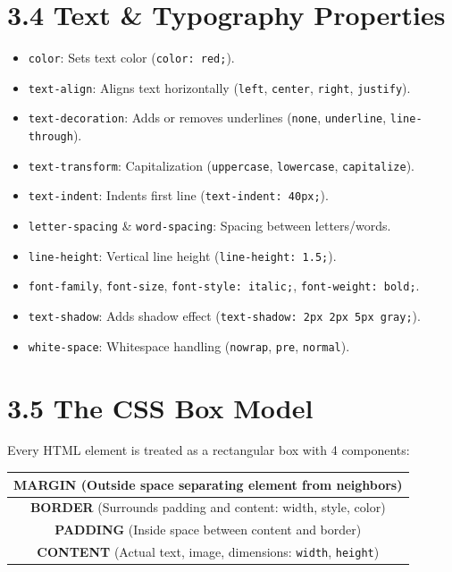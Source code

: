\section{3.4 Text \& Typography Properties}
\begin{itemize}[leftmargin=*]
    \item \texttt{color}: Sets text color (\texttt{color: red;}).
    \item \texttt{text-align}: Aligns text horizontally (\texttt{left}, \texttt{center}, \texttt{right}, \texttt{justify}).
    \item \texttt{text-decoration}: Adds or removes underlines (\texttt{none}, \texttt{underline}, \texttt{line-through}).
    \item \texttt{text-transform}: Capitalization (\texttt{uppercase}, \texttt{lowercase}, \texttt{capitalize}).
    \item \texttt{text-indent}: Indents first line (\texttt{text-indent: 40px;}).
    \item \texttt{letter-spacing} \& \texttt{word-spacing}: Spacing between letters/words.
    \item \texttt{line-height}: Vertical line height (\texttt{line-height: 1.5;}).
    \item \texttt{font-family}, \texttt{font-size}, \texttt{font-style: italic;}, \texttt{font-weight: bold;}.
    \item \texttt{text-shadow}: Adds shadow effect (\texttt{text-shadow: 2px 2px 5px gray;}).
    \item \texttt{white-space}: Whitespace handling (\texttt{nowrap}, \texttt{pre}, \texttt{normal}).
\end{itemize}

\section{3.5 The CSS Box Model}
Every HTML element is treated as a rectangular box with 4 components:
\begin{center}
\begin{tabular}{|c|}
\hline
\textbf{MARGIN} (Outside space separating element from neighbors) \\
\hline
\textbf{BORDER} (Surrounds padding and content: width, style, color) \\
\hline
\textbf{PADDING} (Inside space between content and border) \\
\hline
\textbf{CONTENT} (Actual text, image, dimensions: \texttt{width}, \texttt{height}) \\
\hline
\end{tabular}
\end{center}

